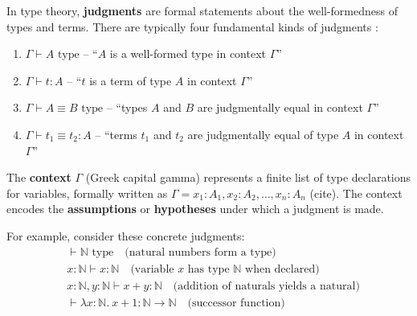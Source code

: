 \begin{example}
  In type theory, \textbf{judgments} are formal statements about the well-formedness of types and terms.
  There are typically four fundamental kinds of judgments \cite{web:1}:

  \begin{enumerate}
    \item $\Gamma \vdash A \text{ type}$ -- ``$A$ is a well-formed type in context $\Gamma$''
    \item $\Gamma \vdash t : A$ -- ``$t$ is a term of type $A$ in context $\Gamma$''
    \item $\Gamma \vdash A \equiv B \text{ type}$ -- ``types $A$ and $B$ are judgmentally equal in context $\Gamma$''
    \item $\Gamma \vdash t_1 \equiv t_2 : A$ -- ``terms $t_1$ and $t_2$ are judgmentally equal of type $A$ in context $\Gamma$''
  \end{enumerate}

  The \textbf{context} $\Gamma$ (Greek capital gamma) represents a finite list of type declarations for variables,
  formally written as $\Gamma = x_1:A_1, x_2:A_2, \ldots, x_n:A_n$ (cite).
  The context encodes the \textbf{assumptions} or \textbf{hypotheses} under which a judgment is made.

  For example, consider these concrete judgments:
  \begin{align}
     & \vdash \mathbb{N} \text{ type} \quad \text{(natural numbers form a type)}                                 \\
     & x:\mathbb{N} \vdash x : \mathbb{N} \quad \text{(variable $x$ has type $\mathbb{N}$ when declared)}        \\
     & x:\mathbb{N}, y:\mathbb{N} \vdash x + y : \mathbb{N} \quad \text{(addition of naturals yields a natural)} \\
     & \vdash \lambda x:\mathbb{N}.\ x + 1 : \mathbb{N} \to \mathbb{N} \quad \text{(successor function)}
  \end{align}
\end{example}




